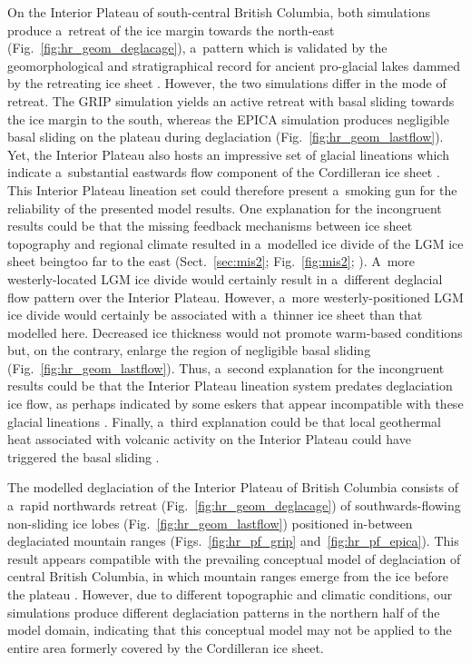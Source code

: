 \documentclass[tc, manuscript]{copernicus}
\begin{document}
      On the Interior Plateau of south-central British Columbia, both
      simulations produce a~retreat of the ice margin towards the north-east
      (Fig.~\ref{fig:hr_geom_deglacage}), a~pattern which is validated by
      the geomorphological and stratigraphical record for ancient
      pro-glacial lakes dammed by the retreating ice sheet
      \citep{Perkins.Brennand.2014}. However, the two simulations differ in
      the mode of retreat. The GRIP simulation yields an active retreat with
      basal sliding towards the ice margin to the south, whereas the EPICA
      simulation produces negligible basal sliding on the plateau during
      deglaciation (Fig.~\ref{fig:hr_geom_lastflow}). Yet, the Interior
      Plateau also hosts an impressive set of glacial lineations which
      indicate a~substantial eastwards flow component of the Cordilleran ice
      sheet \citep{Prest.etal.1968, Kleman.etal.2010}. This Interior Plateau
      lineation set could therefore present a~smoking gun for the
      reliability of the presented model results. One explanation for the
      incongruent results could be that the missing feedback mechanisms
      between ice sheet topography and regional climate resulted in
      a~modelled ice divide of the LGM ice sheet beingtoo far to the east
      (Sect.~\ref{sec:mis2}; Fig.~\ref{fig:mis2};
      \citealp{Seguinot.etal.2014}). A~more westerly-located LGM ice divide
      would certainly result in a~different deglacial flow pattern over the
      Interior Plateau. However, a~more westerly-positioned LGM ice divide
      would certainly be associated with a~thinner ice sheet than that
      modelled here. Decreased ice thickness would not promote warm-based
      conditions but, on the contrary, enlarge the region of negligible
      basal sliding (Fig.~\ref{fig:hr_geom_lastflow}). Thus, a~second
      explanation for the incongruent results could be that the Interior
      Plateau lineation system predates deglaciation ice flow, as perhaps
      indicated by some eskers that appear incompatible with these glacial
      lineations \citep[Fig.~9]{Margold.etal.2013a}. Finally, a~third
      explanation could be that local geothermal heat associated with
      volcanic activity on the Interior Plateau could have triggered the
      basal sliding \citep[cf. Greenland ice
      sheet;][]{Fahnestock.etal.2001}.

      The modelled deglaciation of the Interior Plateau of British Columbia
      consists of a~rapid northwards retreat
      (Fig.~\ref{fig:hr_geom_deglacage}) of southwards-flowing non-sliding
      ice lobes (Fig.~\ref{fig:hr_geom_lastflow}) positioned in-between
      deglaciated mountain ranges (Figs.~\ref{fig:hr_pf_grip}
      and~\ref{fig:hr_pf_epica}). This result appears compatible with the
      prevailing conceptual model of deglaciation of central British
      Columbia, in which mountain ranges emerge from the ice before the
      plateau \citep[Fig.~7]{Fulton.1991}. However, due to different
      topographic and climatic conditions, our simulations produce different
      deglaciation patterns in the northern half of the model domain,
      indicating that this conceptual model may not be applied to the entire
      area formerly covered by the Cordilleran ice sheet.
\end{document}
